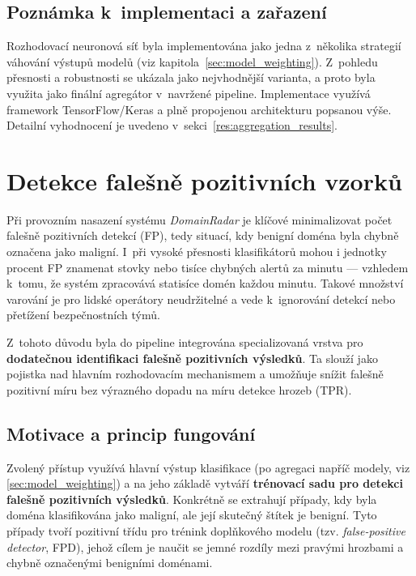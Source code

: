 \subsection*{Poznámka k~implementaci a zařazení}
Rozhodovací neuronová síť byla implementována jako jedna z~několika strategií váhování výstupů modelů (viz kapitola~\ref{sec:model_weighting}). Z~pohledu přesnosti a robustnosti se ukázala jako nejvhodnější varianta, a proto byla využita jako finální agregátor v~navržené pipeline. Implementace využívá framework TensorFlow/Keras a plně propojenou architekturu popsanou výše. Detailní vyhodnocení je uvedeno v~sekci~\ref{res:aggregation_results}.






\section{Detekce falešně pozitivních vzorků}
\label{sec:false_positive_detection}

Při provozním nasazení systému \textit{DomainRadar} je klíčové minimalizovat počet falešně pozitivních detekcí (FP), tedy situací, kdy benigní doména byla chybně označena jako maligní. I~při vysoké přesnosti klasifikátorů mohou i jednotky procent FP znamenat stovky nebo tisíce chybných alertů za minutu — vzhledem k~tomu, že systém zpracovává statisíce domén každou minutu. Takové množství varování je pro lidské operátory neudržitelné a vede k~ignorování detekcí nebo přetížení bezpečnostních týmů. 

Z~tohoto důvodu byla do pipeline integrována specializovaná vrstva pro \textbf{dodatečnou identifikaci falešně pozitivních výsledků}. Ta slouží jako pojistka nad hlavním rozhodovacím mechanismem a umožňuje snížit falešně pozitivní míru bez výrazného dopadu na míru detekce hrozeb (TPR).

\subsection{Motivace a princip fungování}

Zvolený přístup využívá hlavní výstup klasifikace (po agregaci napříč modely, viz \ref{sec:model_weighting}) a na jeho základě vytváří \textbf{trénovací sadu pro detekci falešně pozitivních výsledků}. Konkrétně se extrahují případy, kdy byla doména klasifikována jako maligní, ale její skutečný štítek je benigní. Tyto případy tvoří pozitivní třídu pro trénink doplňkového modelu (tzv. \textit{false-positive detector}, FPD), jehož cílem je naučit se jemné rozdíly mezi pravými hrozbami a chybně označenými benigními doménami.

